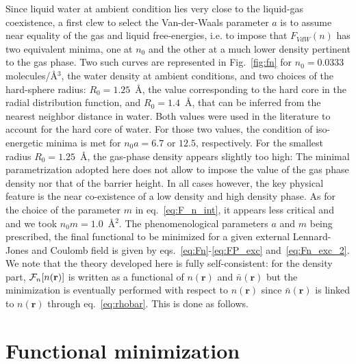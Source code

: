 \documentclass[aip,jcp,showpacs,amsmath,amssymb,superscriptaddress]{revtex4-1}
\newcommand{\rr}{\mathbf{r}}
\newcommand{\rhon}{{n\left({\mathbf r}\right)}}
\newcommand{\F}{{\cal F}}
\newcommand{\rhonbar}{\bar{n}({\mathbf r})}
\begin{document}
Since liquid water at ambient condition lies very close to the liquid-gas coexistence, a first clew to select the Van-der-Waals parameter $a$ is to assume near equality of the gas and liquid free-energies, i.e. to impose that $F_{VdW}(n)$ has two equivalent minima, one at $n_0$ and the other at a much lower density pertinent to the gas phase. Two such curves are represented in Fig.~\ref{fig:fn} for $n_0=0.0333$ molecules/\AA$^3$, the water density at ambient conditions, and two choices of the hard-sphere radius: $R_0=1.25$~\AA, the value corresponding to the hard core in the radial distribution function, and $R_0 = 1.4$~\AA, that can be inferred from  the nearest neighbor distance in water. Both values were used in the literature\cite{oleksy10,zhao-wu11,levesque12_1} to account for the hard core of water. For those two values, the condition of  iso-energetic minima is met for  $n_0a = 6.7$ or $12.5$, respectively. For the smallest radius $R_0 = 1.25$~\AA, the gas-phase density appears slightly too high:  The minimal parametrization adopted here does not allow to impose the value of the gas phase density nor that of the barrier height. In all cases however, the key physical feature is the near co-existence of a low density and high density phase. As for the choice of the parameter  $m$ in eq.~\ref{eq:F_n_int}, it  appears less critical and and we took $n_0m=1.0$~\AA$^2$.
The phenomenological parameters $a$ and $m$ being prescribed, the final functional to be minimized for a given external Lennard-Jones and Coulomb field is given by eqs.~\ref{eq:Fn}-\ref{eq:FP_exc} and~\ref{eq:Fn_exc_2}. We note that the theory developed here is fully self-consistent: for the density part, $\F_n[n(\rr)]$ is written  as a functional of $\rhon$ and $\rhonbar$ but the minimization is eventually performed with respect to  $\rhon$ since $\rhonbar$ is  linked to $\rhon$ through eq.~{\ref{eq:rhobar}}. This is done as follows.




\section{Functional minimization}
\end{document}

